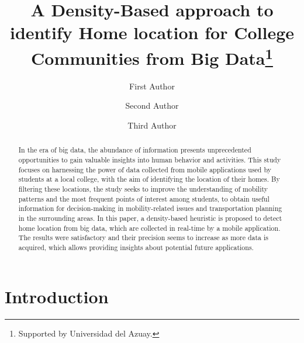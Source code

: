 \documentclass[runningheads]{llncs}
\begin{document}
%
\title{A Density-Based approach to identify Home location for College Communities from Big Data\thanks{Supported by Universidad del Azuay.}}
%
%
\author{First Author \and
Second Author \and
Third Author}
%
%
%
\maketitle              %
%
\begin{abstract}
In the era of big data, the abundance of information presents unprecedented opportunities to gain valuable insights into human behavior and activities. This study focuses on harnessing the power of data collected from mobile applications used by students at a local college, with the aim of identifying the location of their homes. By filtering these locations, the study seeks to improve the understanding of mobility patterns and the most frequent points of interest among students, to obtain useful information for decision-making in mobility-related issues and transportation planning in the surrounding areas. In this paper, a density-based heuristic is proposed to detect home location from big data, which are collected in real-time by a mobile application. The results were satisfactory and their precision seems to increase as more data is acquired, which allows providing insights about potential future applications.
\end{abstract}
\hypertarget{introduction}{%
\section{Introduction}\label{introduction}}
\end{document}
